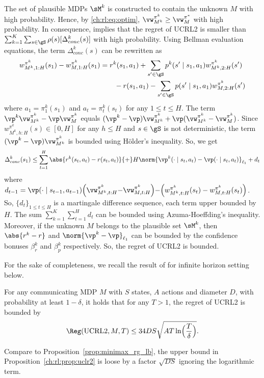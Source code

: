 The set of plausible MDPs $\sM^k$ is constructed to contain the unknown $M$ with high probability.
Hence, by \eqref{ch:rl:eq:optim}, $\vw^{\pi^k}_{M^k}\ge \vw^{\pi^*}_M$ with high probability. 
In consequence,  implies that the regret of UCRL2 is smaller than ${\sum_{k=1}^K\sum_{s\in\gS}\rho(s)[\Delta_{conc}^k(s)]}$ with high probability.
Using Bellman evaluation equations, the term $\Delta_{conc}^k(s)$ can be rewritten as
\begin{align}
    w^{\pi^k}_{M^k,1:H}(s_1) -w^{\pi^k}_{M,1:H}(s_1)
    &= r^k(s_1,a_1)+\sum_{s'\in\gS}p^k(s'\mid s_1,a_1)w^{\pi^k}_{M^k,2:H}(s') \nonumber\\
    &\qquad -r(s_1,a_1)-\sum_{s'\in\gS}p(s'\mid s_1,a_1)w^{\pi^k}_{M,2:H}(s') \label{eq:decom}
\end{align}
where $a_1=\pi^k_1(s_1)$ and $a_t=\pi^k_t(s_t)$ for any $1\le t\le H$.
The term $\vp^k\vw^{\pi^k}_{M^k}-\vp\vw^{\pi^k}_M$ equals $(\vp^k-\vp)\vw^{\pi^k}_{M^k} +\vp(\vw^{\pi^k}_{M^k}-\vw^{\pi^k}_M)$.
Since $w^{\pi^k}_{M^k,h:H}(s)\in [0,H]$ for any $h\le H$ and $s\in\gS$ is not deterministic, the term $(\vp^k-\vp)\vw^{\pi^k}_{M^k}$ is bounded using Hölder's inequality.
So, we get
\begin{equation}
    \label{ch:rl:eq:delta_conc}
    \Delta_{conc}^k(s_1)\le\sum_{t=1}^{H} \abs{r^k(s_t,a_t)-r(s_t,a_t)}{+}H\norm{\vp^k(\cdot\mid s_t,a_t)-\vp(\cdot\mid s_t,a_t)}_{\ell_1} +d_t
\end{equation}
where $d_{t-1}=\vp(\cdot\mid s_{t{-}1},a_{t{-}1})\Bigl(\vw^{\pi^k}_{M^k,t:H} {-}\vw^{\pi^k}_{M,t:H}\Bigr) {-}\Bigl(w^{\pi^k}_{M^k,t:H}(s_{t}) -w^{\pi^k}_{M,t:H}(s_{t})\Bigr)$.
So, $\{d_t\}_{1\le t\le H}$ is a martingale difference sequence, each term upper bounded by $H$.
The sum $\sum_{k=1}^K\sum_{t=1}^Hd_t$ can be bounded using Azuma-Hoeffding's inequality.
Moreover, if the unknown $M$ belongs to the plausible set $\sM^k$, then $\abs{r^k-r}$ and $\norm{\vp^k-\vp}_{\ell_1}$ can be bounded by the confidence bonuses $\beta_r^k$ and $\beta_p^k$ respectively.
So, the regret of UCRL2 is bounded.

For the sake of completeness, we recall the result of \cite{jaksch2010near} for infinite horizon setting below.
\begin{prop}
    \label{ch:rl:prop:uclr2}
    For any communicating MDP $M$ with $S$ states, $A$ actions and diameter $D$, with probability at least $1-\delta$, it holds that for any $T>1$, the regret of UCRL2 is bounded by
    \begin{align*}
        \Reg(\textnormal{UCRL2}, M, T) \le 34DS\sqrt{AT\ln\Bigl(\frac{T}{\delta}\Bigr)}.
    \end{align*}
\end{prop}
Compare to Proposition~\ref{prop:minimax_rg_lb}, the upper bound in Proposition~\ref{ch:rl:prop:uclr2} is loose by a factor $\sqrt{DS}$ ignoring the logarithmic term.

